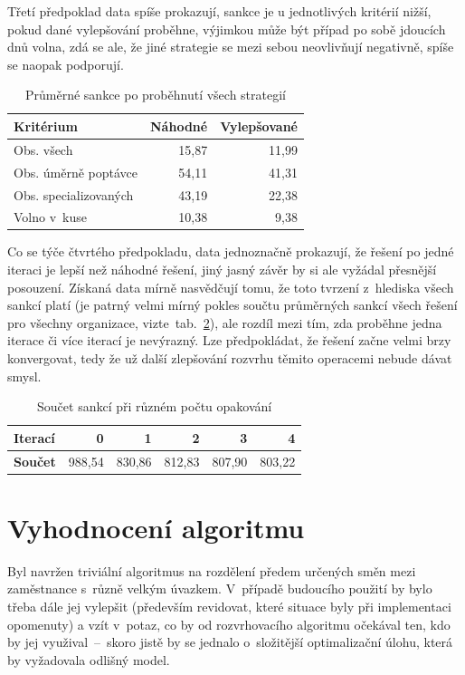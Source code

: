 \documentclass[a4paper,11pt,openany,twoside]{book}
\begin{document}
Třetí předpoklad data spíše prokazují, sankce je u jednotlivých kritérií nižší, pokud dané vylepšování proběhne, výjimkou může být případ po sobě jdoucích dnů volna, zdá se ale, že jiné strategie se mezi sebou neovlivňují negativně, spíše se naopak podporují.

\begin{table}[h]
	\centering
	\caption{Průměrné sankce po proběhnutí všech strategií}
	\label{tab:iterations}
	\begin{tabular}{lrr}
		\hline
		\textbf{Kritérium} & \textbf{Náhodné} & \textbf{Vylepšované}\\
		\hline
		\rowcolor{Gray}
		Obs. všech & 15,87 & 11,99\\
		Obs. úměrně poptávce & 54,11 & 41,31 \\
		\rowcolor{Gray}
		Obs. specializovaných & 43,19 & 22,38\\
		Volno v~kuse & 10,38 & 9,38\\
		\hline
	\end{tabular}
\end{table}

Co se týče čtvrtého předpokladu, data jednoznačně prokazují, že řešení po jedné iteraci je lepší než náhodné řešení, jiný jasný závěr by si ale vyžádal přesnější posouzení. Získaná data mírně nasvědčují tomu, že toto tvrzení z~hlediska všech sankcí platí (je patrný velmi mírný pokles součtu průměrných sankcí všech řešení pro všechny organizace, vizte~tab.~\ref{tab:iterations}), ale rozdíl mezi tím, zda proběhne jedna iterace či více iterací je nevýrazný. Lze předpokládat, že řešení začne velmi brzy konvergovat, tedy že už další zlepšování rozvrhu těmito operacemi nebude dávat smysl.

\begin{table}[h]
	\centering
	\caption{Součet sankcí při různém počtu opakování}
	\label{tab:iterations}
	\begin{tabular}{lrrrrr}
		\hline
		\textbf{Iterací} & 0 & 1 & 2 & 3 & 4\\
		\hline
		\rowcolor{Gray}
		\textbf{Součet} & 988,54 & 830,86 & 812,83  & 807,90 & 803,22\\
		\hline
	\end{tabular}
\end{table}

\section{Vyhodnocení algoritmu}

Byl navržen triviální algoritmus na rozdělení předem určených směn mezi zaměstnance s~různě velkým úvazkem. V~případě budoucího použití by bylo třeba dále jej vylepšit (především revidovat, které situace byly při implementaci opomenuty) a vzít v~potaz, co by od rozvrhovacího algoritmu očekával ten, kdo by jej využival~–~skoro jistě by se jednalo o~složitější optimalizační úlohu, která by vyžadovala odlišný model.
\end{document}
